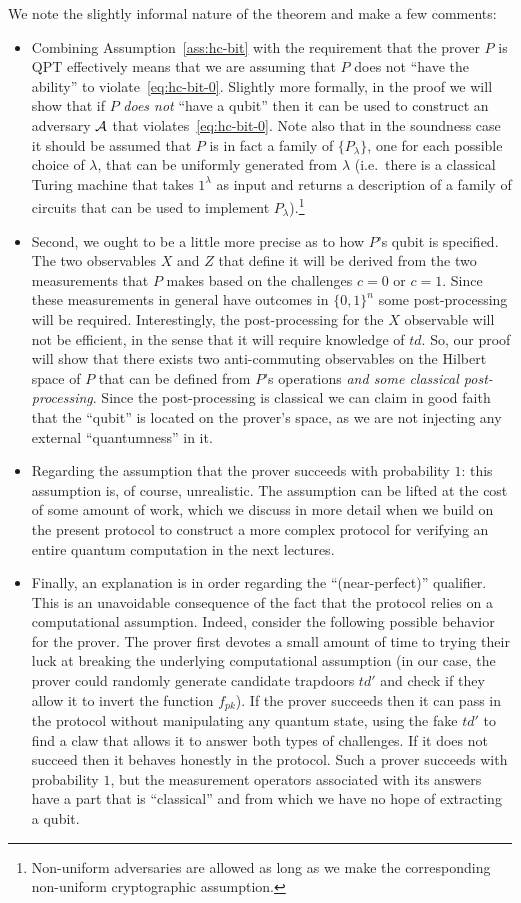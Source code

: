 We note the slightly informal nature of the theorem and make a few comments:
\begin{itemize}
\item Combining Assumption~\ref{ass:hc-bit} with the requirement that the prover $P$ is QPT effectively means that we are assuming that $P$ does not ``have the ability'' to violate~\eqref{eq:hc-bit-0}. Slightly more formally, in the proof we will show that if $P$ \emph{does not} ``have a qubit'' then it can be used to construct an adversary $\mathcal{A}$ that violates~\eqref{eq:hc-bit-0}. Note also that in the soundness case it should be assumed that $P$ is in fact a family of $\{P_\lambda\}$, one for each possible choice of $\lambda$, that can be uniformly generated from $\lambda$ (i.e.\ there is a classical Turing machine that takes $1^\lambda$ as input and returns a description of a family of circuits that can be used to implement $P_\lambda$).\footnote{Non-uniform adversaries are allowed as long as we make the corresponding non-uniform cryptographic assumption.} 
\item
Second, we ought to be a little more precise as to how $P$'s qubit is specified. The two observables $X$ and $Z$ that define it will be derived from the two measurements that $P$ makes based on the challenges $c=0$ or $c=1$. Since these measurements in general have outcomes in $\{0,1\}^n$ some post-processing will be required. Interestingly, the post-processing for the $X$ observable will not be efficient, in the sense that it will require knowledge of $td$. So, our proof will show that there exists two anti-commuting observables on the Hilbert space of $P$ that can be defined from $P$'s operations \emph{and some classical post-processing}. Since the post-processing is classical we can claim in good faith that the ``qubit'' is located on the prover's space, as we are not injecting any external ``quantumness'' in it. 
\item
Regarding the assumption that the prover succeeds with probability $1$: this assumption is, of course, unrealistic. The assumption can be lifted at the cost of some amount of work, which we discuss in more detail when we build on the present protocol to construct a more complex protocol for verifying an entire quantum computation in the next lectures. 
\item
Finally, an explanation is in order regarding the ``(near-perfect)'' qualifier. This is an unavoidable consequence of the fact that the protocol relies on a computational assumption. Indeed, consider the following possible behavior for the prover. The prover first devotes a small amount of time to trying their luck at breaking the underlying computational assumption (in our case, the prover could randomly generate candidate trapdoors $td'$ and check if they allow it to invert the function $f_{pk}$). If the prover succeeds then it can pass in the protocol without manipulating any quantum state, using the fake $td'$ to find a claw that allows it to answer both types of challenges. If it does not succeed then it behaves honestly in the protocol. Such a prover succeeds with probability $1$, but the measurement operators associated with its answers have a part that is ``classical'' and from which we have no hope of extracting a qubit. 

\end{itemize}
